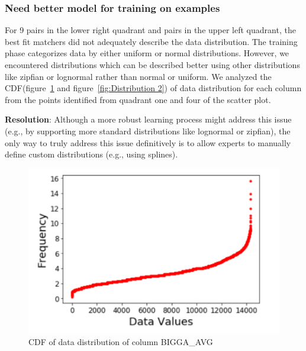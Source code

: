 
\subsubsection{Need better model for training on examples}
For 9 pairs in the lower right quadrant and  pairs in the upper left quadrant, the best fit matchers did not adequately describe the data distribution.
The training phase categorizes data by either uniform or normal distributions. 
However, we encountered distributions which can be described better using other distributions like zipfian or lognormal rather than normal or uniform.
We analyzed the CDF(figure~\ref{fig:Distribution 1} and figure~\ref{fig:Distribution 2}) of data distribution for each column from the points identified from quadrant one and four of the scatter plot. 

\textbf{Resolution}: Although a more robust learning process might address this issue (e.g., by supporting more standard distributions like lognormal or zipfian), the only way to truly address this issue definitively is to allow experts to manually define custom distributions (e.g., using splines).

\begin{figure}[H]
	\centering
	\includegraphics[width=0.8\columnwidth]{graphics/Challenge1_1}
	\caption{CDF of data distribution of column BIGGA\_AVG}
	\label{fig:Distribution 1}
\end{figure}

